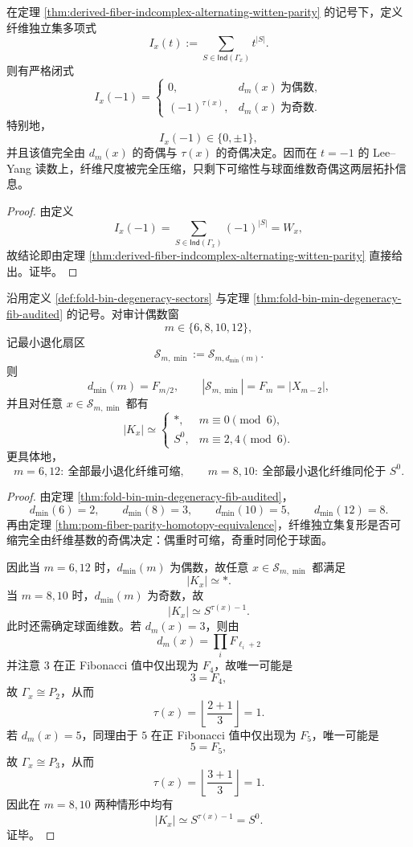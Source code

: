 \begin{corollary}[纤维独立集多项式在 \texorpdfstring{$t=-1$}{t=-1} 的三值压缩]\label{cor:derived-fiber-independence-polynomial-minus-one-trichotomy}
在定理 \ref{thm:derived-fiber-indcomplex-alternating-witten-parity} 的记号下，定义纤维独立集多项式
\[
I_x(t):=\sum_{S\in \mathsf{Ind}(\Gamma_x)} t^{|S|}.
\]
则有严格闭式
\[
I_x(-1)=
\begin{cases}
0, & d_m(x)\ \text{为偶数},\\[4pt]
(-1)^{\tau(x)}, & d_m(x)\ \text{为奇数}.
\end{cases}
\]
特别地，
\[
I_x(-1)\in\{0,\pm 1\},
\]
并且该值完全由 \(d_m(x)\) 的奇偶与 \(\tau(x)\) 的奇偶决定。因而在 \(t=-1\) 的 Lee--Yang 读数上，纤维尺度被完全压缩，只剩下可缩性与球面维数奇偶这两层拓扑信息。
\end{corollary}
\begin{proof}
由定义
\[
I_x(-1)=\sum_{S\in \mathsf{Ind}(\Gamma_x)}(-1)^{|S|}=W_x,
\]
故结论即由定理 \ref{thm:derived-fiber-indcomplex-alternating-witten-parity} 直接给出。证毕。
\end{proof}

\begin{theorem}[审计偶数窗口最小退化扇区的拓扑相位]\label{thm:derived-audited-even-minsector-topological-phase}
沿用定义 \ref{def:fold-bin-degeneracy-sectors} 与定理 \ref{thm:fold-bin-min-degeneracy-fib-audited} 的记号。对审计偶数窗
\[
m\in\{6,8,10,12\},
\]
记最小退化扇区
\[
\mathcal S_{m,\min}:=\mathcal S_{m,d_{\min}(m)}.
\]
则
\[
d_{\min}(m)=F_{m/2},
\qquad
|\mathcal S_{m,\min}|=F_m=|X_{m-2}|,
\]
并且对任意 \(x\in \mathcal S_{m,\min}\) 都有
\[
|K_x|\simeq
\begin{cases}
\ast, & m\equiv 0\pmod 6,\\[4pt]
S^0, & m\equiv 2,4\pmod 6.
\end{cases}
\]
更具体地，
\[
m=6,12:\ \text{全部最小退化纤维可缩},
\qquad
m=8,10:\ \text{全部最小退化纤维同伦于 }S^0.
\]
\end{theorem}
\begin{proof}
由定理 \ref{thm:fold-bin-min-degeneracy-fib-audited}，
\[
d_{\min}(6)=2,\qquad d_{\min}(8)=3,\qquad d_{\min}(10)=5,\qquad d_{\min}(12)=8.
\]
再由定理 \ref{thm:pom-fiber-parity-homotopy-equivalence}，纤维独立集复形是否可缩完全由纤维基数的奇偶决定：偶重时可缩，奇重时同伦于球面。

因此当 \(m=6,12\) 时，\(d_{\min}(m)\) 为偶数，故任意
\(
x\in \mathcal S_{m,\min}
\)
都满足
\[
|K_x|\simeq \ast.
\]
当 \(m=8,10\) 时，\(d_{\min}(m)\) 为奇数，故
\[
|K_x|\simeq S^{\tau(x)-1}.
\]
此时还需确定球面维数。若 \(d_m(x)=3\)，则由
\[
d_m(x)=\prod_i F_{\ell_i+2}
\]
并注意 \(3\) 在正 Fibonacci 值中仅出现为 \(F_4\)，故唯一可能是
\[
3=F_4,
\]
故 \(\Gamma_x\cong P_2\)，从而
\[
\tau(x)=\left\lfloor\frac{2+1}{3}\right\rfloor=1.
\]
若 \(d_m(x)=5\)，同理由于 \(5\) 在正 Fibonacci 值中仅出现为 \(F_5\)，唯一可能是
\[
5=F_5,
\]
故 \(\Gamma_x\cong P_3\)，从而
\[
\tau(x)=\left\lfloor\frac{3+1}{3}\right\rfloor=1.
\]
因此在 \(m=8,10\) 两种情形中均有
\[
|K_x|\simeq S^{\tau(x)-1}=S^0.
\]
证毕。
\end{proof}

